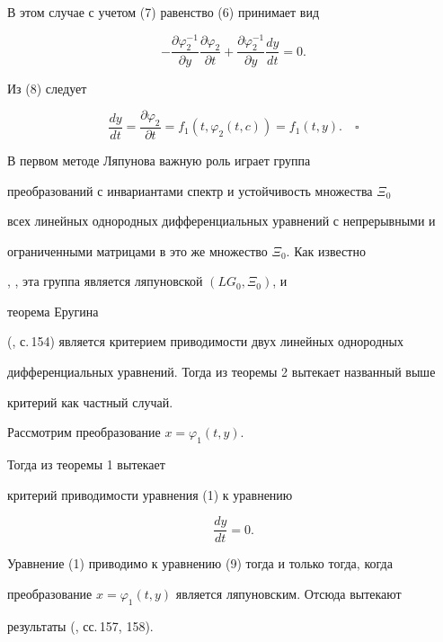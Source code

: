 В этом случае с учетом (7) равенство (6) принимает вид 


\begin{equation} 


-\frac{\partial\varphi^{-1}_2}{\partial y} 


\frac{\partial\varphi_2}{\partial t}+ 


\frac{\partial\varphi^{-1}_2}{\partial y}\frac{dy}{dt}=0. 


\end{equation} 


Из (8) следует 


$$ 


\frac{dy}{dt}=\frac{\partial\varphi_2}{\partial t}= 


f_1(t,\varphi_2(t,c))=f_1(t,y). 


\quad\square 


$$ 


\medskip 


 


В первом методе Ляпунова \cite{3} важную роль играет группа 


преобразований с инвариантами спектр и устойчивость множества $\Xi_0$ 


всех линейных однородных дифференциальных уравнений с непрерывными и 


ограниченными матрицами в это же множество $\Xi_0$. Как известно 


\cite{1}, \cite{2}, эта группа является ляпуновской $(LG_0,\Xi_0)$, и


теорема Еругина 


(\cite{2}, с.\,154) является критерием приводимости двух линейных однородных 


дифференциальных уравнений. Тогда из теоремы 2 вытекает названный выше 


критерий как частный случай. 


 


\begin{cornonum} 


Рассмотрим преобразование $x=\varphi_1(t,y)$. 


Тогда из теоремы 1 вытекает 


критерий приводимости уравнения (1) к уравнению 


\begin{equation} 


\frac{dy}{dt}=0. 


\end{equation} 


Уравнение (1) приводимо к уравнению (9) тогда и только тогда, когда 


преобразование $x=\varphi_1(t,y)$ является ляпуновским. Отсюда вытекают 


результаты (\cite{2}, сс.\,157, 158). 


\end{cornonum} 


